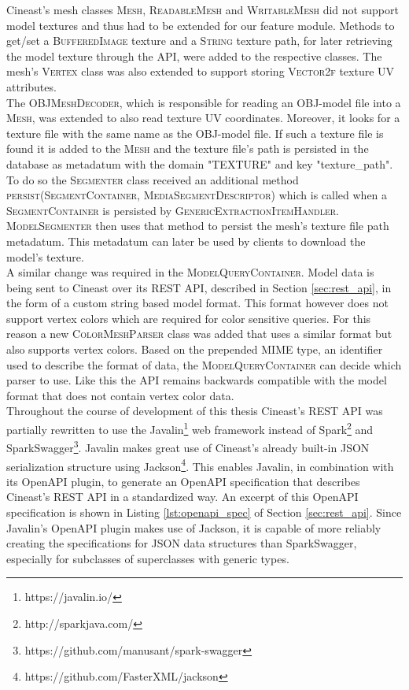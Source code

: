 Cineast's mesh classes \textsc{Mesh}, \textsc{ReadableMesh} and \textsc{WritableMesh} did not support model textures and thus had to be extended
for our feature module. Methods to get/set a \textsc{BufferedImage} texture and a \textsc{String} texture path, for later retrieving the model texture
through the API, were added to the respective classes. The mesh's \textsc{Vertex} class was also extended to support storing \textsc{Vector2f} texture UV attributes.\\
The \textsc{OBJMeshDecoder}, which is responsible for reading an OBJ-model file into a \textsc{Mesh}, was extended to also read texture UV coordinates.
Moreover, it looks for a texture file with the same name as the OBJ-model file. If such a texture file is found it is added to the \textsc{Mesh} and the texture file's
path is persisted in the database as metadatum with the domain "TEXTURE" and key "texture\_path". To do so the \textsc{Segmenter} class received an additional method
\textsc{persist(SegmentContainer, MediaSegmentDescriptor)} which is called when a \textsc{SegmentContainer} is persisted by \textsc{GenericExtractionItemHandler}.
\textsc{ModelSegmenter} then uses that method to persist the mesh's texture file path metadatum. This metadatum can later be used by clients to download the model's texture.\\
A similar change was required in the \textsc{ModelQueryContainer}. Model data is being sent to Cineast over its REST API, described in Section \ref{sec:rest_api}, in the form of a custom string based model format. This format however does not support vertex colors which are required for color sensitive queries. For this reason a new \textsc{ColorMeshParser} class was added that uses a similar format but also supports vertex colors. Based on the prepended MIME type, an identifier used to describe the format of data, the \textsc{ModelQueryContainer} can decide which parser to use. Like this the API remains backwards compatible with the model format that does not contain vertex color data.\\
Throughout the course of development of this thesis Cineast's REST API was partially rewritten to use the Javalin\footnote{https://javalin.io/} web framework instead of Spark\footnote{http://sparkjava.com/} and SparkSwagger\footnote{https://github.com/manusant/spark-swagger}. Javalin makes great use of Cineast's already built-in JSON serialization structure using Jackson\footnote{https://github.com/FasterXML/jackson}. This enables Javalin, in combination with its OpenAPI plugin,
to generate an OpenAPI specification \cite{openapi} that describes Cineast's REST API in a standardized way. An excerpt of this OpenAPI specification is shown in Listing \ref{lst:openapi_spec} of Section \ref{sec:rest_api}. Since Javalin's OpenAPI plugin makes use of Jackson, it is capable of more reliably creating the specifications for JSON data structures than SparkSwagger, especially for subclasses of superclasses with generic types.

